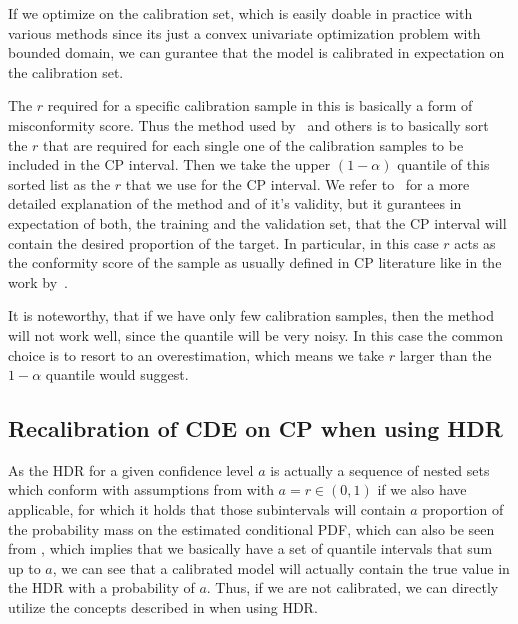 If we optimize  on the calibration set, which is easily doable in practice with various methods since its just a convex univariate optimization problem with bounded domain, we can gurantee that the model is calibrated in expectation on the calibration set.

The $r$ required for a specific calibration sample in this  is basically a form of misconformity score. Thus the method used by~\cite{sesia2021conformal, chernozhukov2021distributional} and others is to basically sort the $r$ that are required for each single one of the calibration samples to be included in the CP interval. Then we take the upper $(1- \alpha)$ quantile of this sorted list as the $r$ that we use for the CP interval. We refer to~\cite{sesia2021conformal} for a more detailed explanation of the method and of it's validity, but it gurantees in expectation of both, the training and the validation set, that the CP interval will contain the desired proportion of the target. In particular, in this case $r$ acts as the conformity score of the sample as usually defined in CP literature like in the work by~\cite{sesia2021conformal}.

It is noteworthy, that if we have only few calibration samples, then the method will not work well, since the quantile will be very noisy. In this case the common choice is to resort to an overestimation, which means we take $r$ larger than the $1-\alpha$ quantile would suggest.

\subsection{Recalibration of CDE on CP when using HDR}\label{sec:cp_sub_cde_hrd}

As the HDR for a given confidence level $a$ is actually a sequence of nested sets which conform with assumptions from  with $a = r \in (0,1)$ if we also have  applicable, for which it holds that those subintervals will contain $a$ proportion of the probability mass on the estimated conditional PDF, which can also be seen from , which implies that we basically have a set of quantile intervals that sum up to $a$, we can see that a calibrated model will actually contain the true value in the HDR with a probability of $a$. Thus, if we are not calibrated, we can directly utilize the concepts described in  when using HDR.\@

